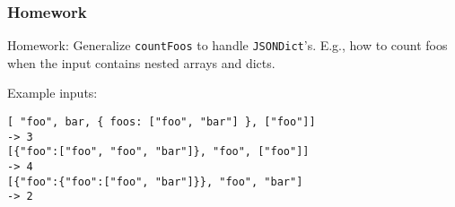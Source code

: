 \documentclass{beamer}
\begin{document}
\begin{frame}[fragile]
\frametitle{Homework}

Homework: Generalize \verb+countFoos+ to handle \verb+JSONDict+'s.
E.g., how to count foos when the input contains nested arrays and
dicts.

\bigskip

Example inputs:

\begin{verbatim}
[ "foo", bar, { foos: ["foo", "bar"] }, ["foo"]]
-> 3
[{"foo":["foo", "foo", "bar"]}, "foo", ["foo"]]
-> 4
[{"foo":{"foo":["foo", "bar"]}}, "foo", "bar"]
-> 2
\end{verbatim}


\end{frame}


\end{document}
